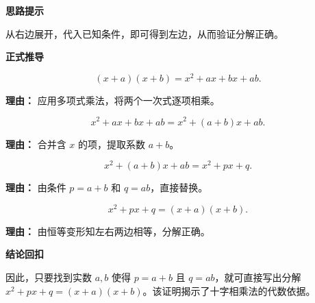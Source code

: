 \begin{proofbox}
	\textbf{\textcolor{CProof}{思路提示}}

	从右边展开，代入已知条件，即可得到左边，从而验证分解正确。

	\medskip
	\textbf{\textcolor{CProof}{正式推导}}
	\begin{description}[style=nextline, leftmargin=2.8em, labelsep=0.5em, itemsep=0.55em]
		\item[\textbf{步骤一（展开乘积）：}]
			\[
				(x+a)(x+b)=x^2+ax+bx+ab.
			\]
			\par\textbf{理由：}
			应用多项式乘法，将两个一次式逐项相乘。

		\item[\textbf{步骤二（合并同类项）：}]
			\[
				x^2+ax+bx+ab=x^2+(a+b)x+ab.
			\]
			\par\textbf{理由：}
			合并含 $x$ 的项，提取系数 $a+b$。

		\item[\textbf{步骤三（条件替换）：}]
			\[
				x^2+(a+b)x+ab = x^2+px+q.
			\]
			\par\textbf{理由：}
			由条件 $p=a+b$ 和 $q=ab$，直接替换。

		\item[\textbf{步骤四（得出结论）：}]
			\[
				x^2+px+q=(x+a)(x+b).
			\]
			\par\textbf{理由：}
			由恒等变形知左右两边相等，分解正确。
	\end{description}

	\medskip
	\textbf{\textcolor{CProof}{结论回扣}}

	因此，只要找到实数 $a,b$ 使得 $p=a+b$ 且 $q=ab$，就可直接写出分解 $x^2+px+q=(x+a)(x+b)$。该证明揭示了十字相乘法的代数依据。
\end{proofbox}

